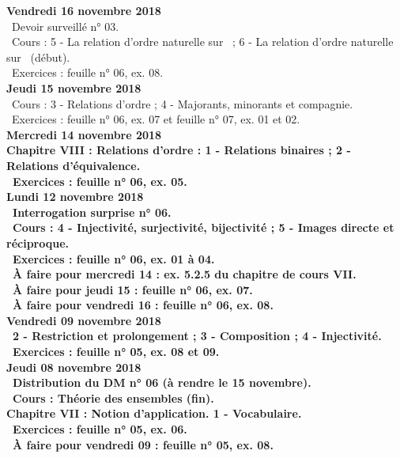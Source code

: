 \documentclass[12pt,a4paper]{article}
\begin{document}
\noindent\textbf{Vendredi 16 novembre 2018}\\
\bu\ Devoir surveillé n° 03.\\
\bu\ Cours : 5 - La relation d'ordre naturelle sur \N\ ; 6 - La relation d'ordre naturelle sur \R\ (début).\\
\bu\ Exercices : feuille n° 06, ex. 08.\vspace{.4cm}\\
 
\noindent\textbf{Jeudi 15 novembre 2018}\\
\bu\ Cours : 3 - Relations d'ordre ;  4 - Majorants, minorants et compagnie.\\
\bu\ Exercices : feuille n° 06, ex. 07 et feuille n° 07, ex. 01 et 02.\vspace{.4cm}\\

\noindent\textbf{\bf Mercredi 14 novembre 2018}\\
\bf Chapitre VIII \rm : Relations d'ordre : 1 - Relations binaires ; 2 - Relations d'équivalence.\\
\bu\ Exercices : feuille n° 06, ex. 05.\vspace{.4cm}\\
 
\noindent\textbf{Lundi 12 novembre 2018}\\
\bu\ Interrogation surprise n° 06.\\
\bu\ Cours : 4 - Injectivité, surjectivité, bijectivité ; 5 - Images directe et réciproque.\\
\bu\ Exercices : feuille n° 06, ex. 01 à 04.\\
\bu\ À faire pour mercredi 14 : ex. 5.2.5 du chapitre de cours VII.\\
\bu\ À faire pour jeudi 15 : feuille n° 06, ex. 07.\\
\bu\ À faire pour vendredi 16 : feuille n° 06, ex. 08.\vspace{.4cm}\\

\noindent\textbf{Vendredi 09 novembre 2018}\\
\cours\ 2 - Restriction et prolongement ; 3 - Composition ; 4 - Injectivité.\\
\bu\ Exercices : feuille n° 05, ex. 08 et 09.\vspace{.4cm}\\

\noindent\textbf{Jeudi 08 novembre 2018}\\
\bu\ Distribution du DM n° 06 (à rendre le 15 novembre).\\
\bu\ Cours : Théorie des ensembles (fin).\\
\bf Chapitre VII \rm : Notion d'application. 1 - Vocabulaire.\\
\bu\ Exercices : feuille n° 05, ex. 06.\\
\bu\ À faire pour vendredi 09 : feuille n° 05, ex. 08.\vspace{.4cm}\\
 
\end{document}
